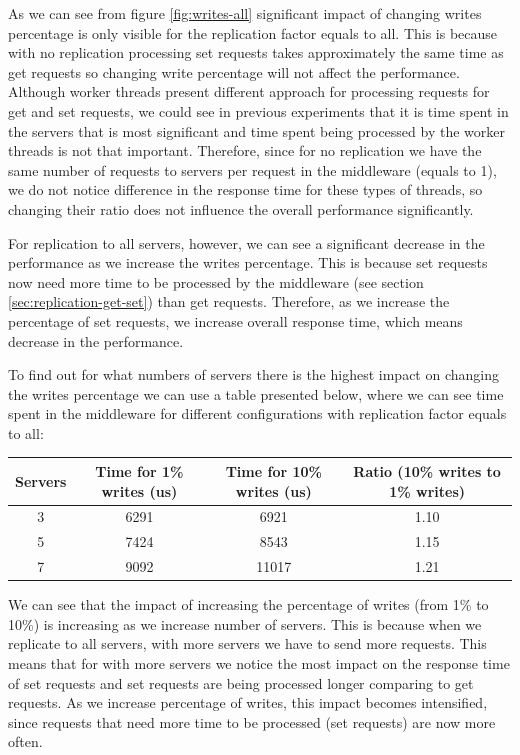 \documentclass[11pt]{article}
\begin{document}
As we can see from figure \ref{fig:writes-all} significant impact of changing writes percentage is only visible for the replication factor equals to all. This is because with no replication processing set requests takes approximately the same time as get requests so changing write percentage will not affect the performance. Although worker threads present different approach for processing requests for get and set requests, we could see in previous experiments that it is time spent in the servers that is most significant and time spent being processed by the worker threads is not that important. Therefore, since for no replication we have the same number of requests to servers per request in the middleware (equals to 1), we do not notice difference in the response time for these types of threads, so changing their ratio does not influence the overall performance significantly.

For replication to all servers, however, we can see a significant decrease in the performance as we increase the writes percentage. This is because set requests now need more time to be processed by the middleware (see section \ref{sec:replication-get-set}) than get requests. Therefore, as we increase the percentage of set requests, we increase overall response time, which means decrease in the performance.

To find out for what numbers of servers there is the highest impact on changing the writes percentage we can use a table presented below, where we can see time spent in the middleware for different configurations with replication factor equals to all:
\medskip

\begin{tabular}{|c|c|c|c|}
\hline Servers & Time for 1\% writes (us) & Time for 10\% writes (us) & Ratio (10\% writes to 1\% writes) \\ 
\hline 3 & 6291 & 6921 & 1.10 \\ 
\hline 5 & 7424  &  8543 & 1.15 \\
\hline 7 & 9092 & 11017 & 1.21\\
\hline 
\end{tabular}
\medskip

We can see that the impact of increasing the percentage of writes (from 1\% to 10\%) is increasing as we increase number of servers. This is because when we replicate to all servers, with more servers we have to send more requests. This means that for with more servers we notice the most impact on the response time of set requests and set requests are being processed longer comparing to get requests. As we increase percentage of writes, this impact becomes intensified, since requests that need more time to be processed (set requests) are now more often.
\end{document}
